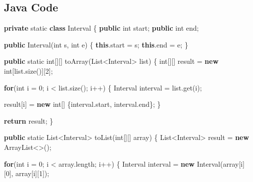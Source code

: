 \documentclass[]{book}
\newenvironment{Shaded}{\begin{snugshade}}{\end{snugshade}}
\newcommand{\BuiltInTok}[1]{#1}
\newcommand{\DataTypeTok}[1]{\textcolor[rgb]{0.13,0.29,0.53}{#1}}
\newcommand{\DecValTok}[1]{\textcolor[rgb]{0.00,0.00,0.81}{#1}}
\newcommand{\FunctionTok}[1]{\textcolor[rgb]{0.00,0.00,0.00}{#1}}
\newcommand{\KeywordTok}[1]{\textcolor[rgb]{0.13,0.29,0.53}{\textbf{#1}}}
\newcommand{\NormalTok}[1]{#1}
\begin{document}
\hypertarget{java-code-18}{%
\subsection{Java Code}\label{java-code-18}}

\begin{Shaded}
\begin{Highlighting}[]
\KeywordTok{private} \DataTypeTok{static} \KeywordTok{class}\NormalTok{ Interval \{}
    \KeywordTok{public} \DataTypeTok{int}\NormalTok{ start;}
    \KeywordTok{public} \DataTypeTok{int}\NormalTok{ end;}

    \KeywordTok{public} \FunctionTok{Interval}\NormalTok{(}\DataTypeTok{int}\NormalTok{ s, }\DataTypeTok{int}\NormalTok{ e) \{}
        \KeywordTok{this}\NormalTok{.}\FunctionTok{start}\NormalTok{ = s;}
        \KeywordTok{this}\NormalTok{.}\FunctionTok{end}\NormalTok{ = e;}
\NormalTok{    \}}

    \KeywordTok{public} \DataTypeTok{static} \DataTypeTok{int}\NormalTok{[][] }\FunctionTok{toArray}\NormalTok{(}\BuiltInTok{List}\NormalTok{<Interval> list) \{}
        \DataTypeTok{int}\NormalTok{[][] result = }\KeywordTok{new} \DataTypeTok{int}\NormalTok{[list.}\FunctionTok{size}\NormalTok{()][}\DecValTok{2}\NormalTok{];}

        \KeywordTok{for}\NormalTok{(}\DataTypeTok{int}\NormalTok{ i = }\DecValTok{0}\NormalTok{; i < list.}\FunctionTok{size}\NormalTok{(); i++) \{}
\NormalTok{            Interval interval = list.}\FunctionTok{get}\NormalTok{(i);}

\NormalTok{            result[i] = }\KeywordTok{new} \DataTypeTok{int}\NormalTok{[] \{interval.}\FunctionTok{start}\NormalTok{, interval.}\FunctionTok{end}\NormalTok{\};}
\NormalTok{        \}}

        \KeywordTok{return}\NormalTok{ result;}
\NormalTok{    \}}

    \KeywordTok{public} \DataTypeTok{static} \BuiltInTok{List}\NormalTok{<Interval> }\FunctionTok{toList}\NormalTok{(}\DataTypeTok{int}\NormalTok{[][] array) \{}
        \BuiltInTok{List}\NormalTok{<Interval> result = }\KeywordTok{new} \BuiltInTok{ArrayList}\NormalTok{<>();}

        \KeywordTok{for}\NormalTok{(}\DataTypeTok{int}\NormalTok{ i = }\DecValTok{0}\NormalTok{; i < array.}\FunctionTok{length}\NormalTok{; i++) \{}
\NormalTok{            Interval interval = }\KeywordTok{new} \FunctionTok{Interval}\NormalTok{(array[i][}\DecValTok{0}\NormalTok{], array[i][}\DecValTok{1}\NormalTok{]);}


\end{Highlighting}
\end{Shaded}
\end{document}
